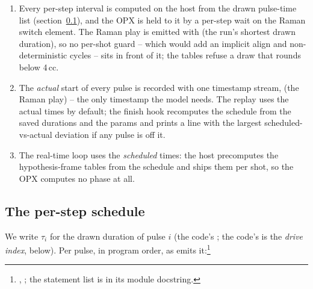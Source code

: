 \begin{enumerate}[nosep]
  \item Every per-step interval is computed on the host from the drawn
    pulse-time list (section~\ref{sec:feedback:schedule}), and the OPX is held
    to it by a per-step wait on the Raman switch element. The Raman play is
    emitted with  (the run's shortest drawn duration), so no
    per-shot  guard -- which would add an implicit align and
    non-deterministic cycles -- sits in front of it; the tables refuse a draw
    that rounds below 4\,cc.
  \item The \emph{actual} start of every pulse is recorded with one timestamp
    stream,  (the Raman  play) -- the
    only timestamp the model needs. The replay uses the actual times by
    default; the finish hook recomputes the schedule from the saved durations
    and the params and prints a \code{***} line with the largest
    scheduled-vs-actual deviation if any pulse is off it.
  \item The real-time loop uses the \emph{scheduled} times: the host
    precomputes the hypothesis-frame tables from the schedule and ships them
    per shot, so the OPX computes no phase at all.
\end{enumerate}

\subsection{The per-step schedule}
\label{sec:feedback:schedule}

We write $\tau_i$ for the drawn duration of pulse $i$ (the code's
; the code's  is the \emph{drive index}, below). Per
pulse, in program order, as  emits
it:\footnote{,
; the statement list is in its module docstring.}

